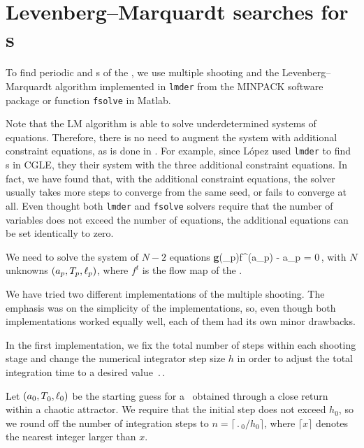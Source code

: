 
\section{Levenberg--Marquardt searches for \rpo s}
\label{sec:lmderRLD}

To find periodic and \rpo s of the \KSe , we use multiple shooting and
the Levenberg--Marquardt algorithm implemented in {\tt lmder} from
the MINPACK software package or function {\tt fsolve} in Matlab.

Note that the LM algorithm is able to solve underdetermined systems of
equations.  Therefore, there is no need to augment the system with
additional constraint equations, as is done in .
For example, since L{\'o}pez {\etal} used {\tt lmder} to
find \rpo s in CGLE, they  their system with the
three additional constraint equations.  In fact, we have found that,
with the additional constraint equations, the solver usually takes more
steps to converge from the same seed, or fails to converge at all. Even
thought both {\tt lmder} and {\tt fsolve} solvers require that the
number of variables does not exceed the number of equations, the
additional equations can be set identically to zero.

We need to solve the system of $N-2$ equations
\beq
  {\bf g}(\shift_p)f^(a_p) - a_p = 0\,,
with $N$ unknowns $(a_p, {T_{p}}, \ell_p)$, where $f^t$
is the flow map of the \KSe.

We have tried two different implementations of the multiple shooting.
The emphasis was on the simplicity of the implementations, so, even
though both implementations worked equally well, each of them had
its own minor drawbacks.

In the first implementation, we fix the total number of steps within
each shooting stage and change the numerical integrator step size
$h$ in order to adjust the total integration time to a desired value
$\period{}$.

Let $(a_0, {T_{}}_0, \ell_0)$ be the starting guess for a \rpo\
obtained through a close return within a chaotic attractor.  We
require that the initial step does not exceed $h_0$, so we round off the
number of integration steps to $n = \lceil \period{}_0/h_0\rceil$, where
$\lceil x \rceil$ denotes the nearest integer larger than $x$.

